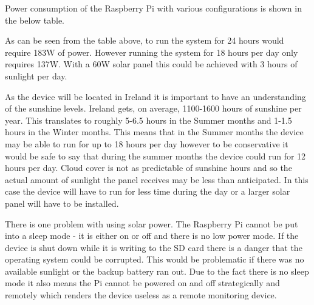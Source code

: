 \documentclass[10pt,a4paper]{article}
\begin{document}
Power consumption of the Raspberry Pi with various configurations is shown in the below table. 

\begin{table}
  \centering
  \caption{Monitoring system power requirements}
  \label{tab:powerRequirements}
  \end{table}

As can be seen from the table above, to run the system for 24 hours would require 183W of power. However running the system for 18 hours per day only requires 137W. With a 60W solar panel this could be achieved with 3 hours of sunlight per day. 

As the device will be located in Ireland it is important to have an understanding of the sunshine levels. Ireland gets, on average, 1100-1600 hours of sunshine per year\cite{website:metsunshine}. This translates to roughly 5-6.5 hours in the Summer months and 1-1.5 hours in the Winter months. This means that in the Summer months the device may be able to run for up to 18 hours per day however to be conservative it would be safe to say that during the summer months the device could run for 12 hours per day. Cloud cover is not as predictable of sunshine hours and so the actual amount of sunlight the panel receives may be less than anticipated. In this case the device will have to run for less time during the day or a larger solar panel will have to be installed. 

There is one problem with using solar power. The Raspberry Pi cannot be put into a sleep mode - it is either on or off and there is no low power mode. If the device is shut down while it is writing to the SD card there is a danger that the operating system could be corrupted. This would be problematic if there was no available sunlight or the backup battery ran out. Due to the fact there is no sleep mode it also means the Pi cannot be powered on and off strategically and remotely which renders the device useless as a remote monitoring device. 
\end{document}
